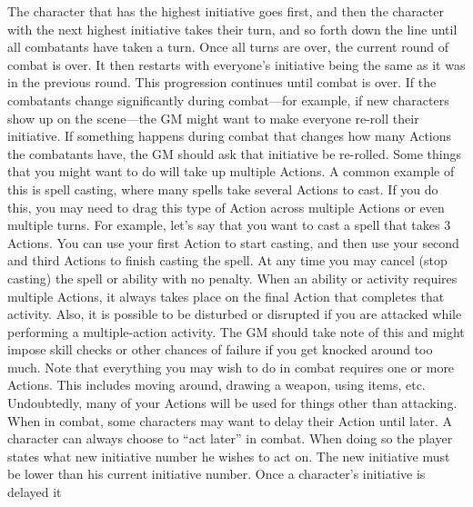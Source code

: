 \documentclass[twoside]{book}
\begin{document}
   The character that has the highest initiative goes
             first, and then the character with the next highest
             initiative takes their turn, and so forth down the line
             until all combatants have taken a turn.  Once all turns are over, the current round of combat
             is over. It then restarts with everyone’s initiative
             being the same as it was in the previous round. This
             progression continues until combat is over. If the
             combatants change significantly during combat—for
             example, if new characters show up on the scene—the GM
             might want to make everyone re-roll their initiative. If
             something happens during combat that changes how many
             Actions the combatants have, the GM should ask that
             initiative be re-rolled.  Some things that you might want to do will take up
             multiple Actions. A common example of this is spell casting,
             where many spells take several Actions to cast. If you do
             this, you may need to drag this type of Action across
             multiple Actions or even multiple turns. For example,
             let’s say that you want to cast a spell that takes 3
             Actions. You can use your first Action to start casting, and
             then use your second and third Actions to finish casting the
             spell. At any time you may cancel (stop casting) the spell
             or ability with no penalty. When an ability or activity
             requires multiple Actions, it always takes place on the
             final Action that completes that activity. Also, it is
             possible to be disturbed or disrupted if you are attacked
             while performing a multiple-action activity. The GM should
             take note of this and might impose skill checks or other
             chances of failure if you get knocked around too much.
              Note that everything you may wish to do in combat
             requires one or more Actions. This includes moving around,
             drawing a weapon, using items, etc. Undoubtedly, many of
             your Actions will be used for things other than attacking.
              When in combat, some characters may want to delay
             their Action until later. A character can always choose to
             “act later” in combat. When doing so the player
             states what new initiative number he wishes to act on. The
             new initiative must be lower than his current initiative
             number. Once a character’s initiative is delayed it
\end{document}
